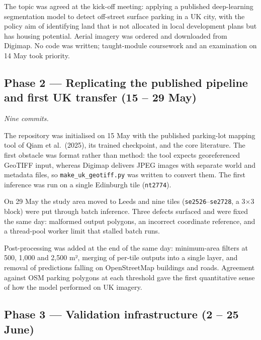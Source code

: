 The topic was agreed at the kick-off meeting: applying a published deep-learning segmentation model to detect off-street surface parking in a UK city, with the policy aim of identifying land that is not allocated in local development plans but has housing potential. Aerial imagery was ordered and downloaded from Digimap. No code was written; taught-module coursework and an examination on 14 May took priority.

\hypertarget{phase-2-replicating-the-published-pipeline-and-first-uk-transfer-15-29-may}{%
\subsection*{Phase 2 --- Replicating the published pipeline and first UK transfer (15 -- 29 May)}\label{phase-2-replicating-the-published-pipeline-and-first-uk-transfer-15-29-may}}

\emph{Nine commits.}

The repository was initialised on 15 May with the published parking-lot mapping tool of Qiam et al.~(2025), its trained checkpoint, and the core literature. The first obstacle was format rather than method: the tool expects georeferenced GeoTIFF input, whereas Digimap delivers JPEG images with separate world and metadata files, so \texttt{make\_\allowbreak{}uk\_\allowbreak{}geotiff.\allowbreak{}py} was written to convert them. The first inference was run on a single Edinburgh tile (\texttt{nt2774}).

On 29 May the study area moved to Leeds and nine tiles (\texttt{se2526}--\texttt{se2728}, a 3×3 block) were put through batch inference. Three defects surfaced and were fixed the same day: malformed output polygons, an incorrect coordinate reference, and a thread-pool worker limit that stalled batch runs.

Post-processing was added at the end of the same day: minimum-area filters at 500, 1,000 and 2,500 m², merging of per-tile outputs into a single layer, and removal of predictions falling on OpenStreetMap buildings and roads. Agreement against OSM parking polygons at each threshold gave the first quantitative sense of how the model performed on UK imagery.

\hypertarget{phase-3-validation-infrastructure-2-25-june}{%
\subsection*{Phase 3 --- Validation infrastructure (2 -- 25 June)}\label{phase-3-validation-infrastructure-2-25-june}}

